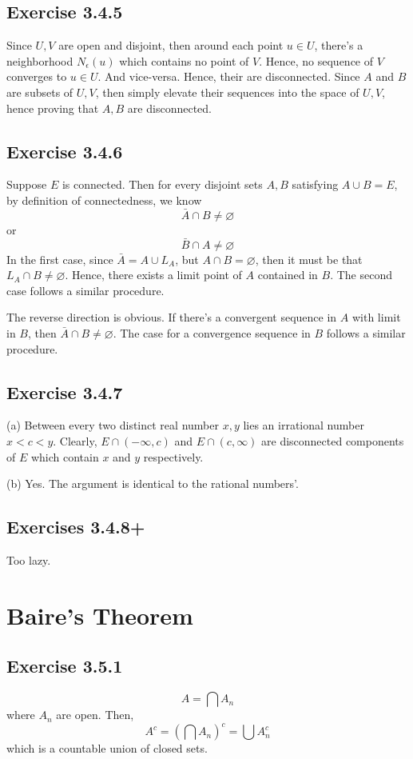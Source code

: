 \documentclass{book}
\begin{document}
\subsection*{Exercise 3.4.5}
Since $U, V$ are open and disjoint, then around each point $u \in U$, there's a neighborhood $N_\epsilon(u)$ which contains no point of $V$. Hence, no sequence of $V$ converges to $u \in U$. And vice-versa. Hence, their are disconnected. Since $A$ and $B$ are subsets of $U, V$, then simply elevate their sequences into the space of $U, V$, hence proving that $A, B$ are disconnected.

\subsection*{Exercise 3.4.6}
Suppose $E$ is connected. Then for every disjoint sets $A, B$ satisfying $A \cup B = E$, by definition of connectedness, we know
$$\bar{A} \cap B \neq \varnothing$$
or
$$\bar{B} \cap A \neq \varnothing$$
In the first case, since $\bar{A} = A \cup L_A$, but $A \cap B = \varnothing$, then it must be that $L_A \cap B \neq \varnothing$. Hence, there exists a limit point of $A$ contained in $B$. The second case follows a similar procedure.

The reverse direction is obvious. If there's a convergent sequence in $A$ with limit in $B$, then $\bar{A} \cap B \neq \varnothing$. The case for a convergence sequence in $B$ follows a similar procedure.

\subsection*{Exercise 3.4.7}
(a)
Between every two distinct real number $x, y$ lies an irrational number $x < c < y$. Clearly, $E \cap (-\infty, c)$ and $E \cap (c, \infty)$ are disconnected components of $E$ which contain $x$ and $y$ respectively.

\noindent
(b)
Yes. The argument is identical to the rational numbers'.

\subsection*{Exercises 3.4.8+}
Too lazy.

\section{Baire's Theorem}

\subsection*{Exercise 3.5.1}
$$A = \bigcap A_n$$
where $A_n$ are open. Then,
$$A^c = \left( \bigcap A_n \right)^c = \bigcup A_n^c$$
which is a countable union of closed sets.
\end{document}
